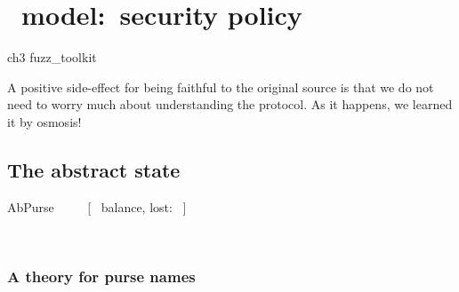 \chapter{\Abs\ model:~security policy}\label{ch3}

\begin{zsection}
  \SECTION ch3 \parents fuzz\_toolkit
\end{zsection}

A positive side-effect for being faithful to the
original source is that we do not need to worry
much about understanding the protocol. As it happens,
we learned it by osmosis!

\section{The abstract state}\label{ch3.abstractState}

\begin{LSDef}
\begin{zed}
   AbPurse ~~~~ [~ balance, lost: \nat ~]
\end{zed}~\end{LSDef}

\subsection{A theory for purse names}\label{ch3.pursenames}

